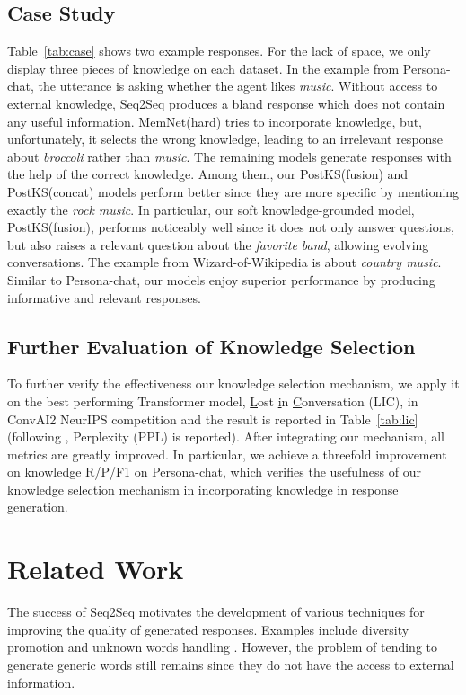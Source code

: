 \documentclass{article}
\begin{document}
\subsection{Case Study}
Table~\ref{tab:case} shows two example responses.
For the lack of space, 
we only display three pieces of knowledge on each dataset.
%
In the example from Persona-chat,
the utterance is asking whether the agent likes \emph{music}.
Without access to external knowledge,
Seq2Seq produces a bland response which does not contain any useful information.
MemNet(hard) tries to incorporate knowledge,
but, unfortunately, it selects the wrong knowledge, 
leading to an irrelevant response about \emph{broccoli} rather than \emph{music}.
The remaining models generate responses with the help of the correct knowledge.
Among them, our PostKS(fusion) and PostKS(concat) models perform better
since they are more specific by mentioning exactly the \emph{rock music}.
In particular, our soft knowledge-grounded model, PostKS(fusion), performs noticeably well
since it does not only answer questions, but also raises a relevant question about the \emph{favorite band}, allowing evolving conversations. 
The example from Wizard-of-Wikipedia is about \emph{country music}.
Similar to Persona-chat,
our models enjoy superior performance by producing informative and relevant responses. 

\subsection{Further Evaluation of Knowledge Selection}
To further verify the effectiveness our knowledge selection mechanism,
we apply it on the best performing Transformer model, \underline{L}ost \underline{i}n \underline{C}onversation (LIC), in ConvAI2 NeurIPS competition \cite{dinan2019second}
and the result is reported in Table~\ref{tab:lic} (following \cite{dinan2018wizard}, Perplexity (PPL) is reported). 
After integrating our mechanism,
all metrics are greatly improved.
In particular, we achieve a threefold improvement on knowledge R/P/F1 on Persona-chat,
which verifies the usefulness of our knowledge selection mechanism in incorporating knowledge in response generation.

\section{Related Work}
The success of Seq2Seq motivates the development of various techniques for improving the quality of generated responses.
Examples include diversity promotion \cite{li2016diversity} and unknown words handling \cite{gu2016incorporating}.
However, the problem of tending to generate generic words still remains 
since they do not have the access to external information.
\end{document}
